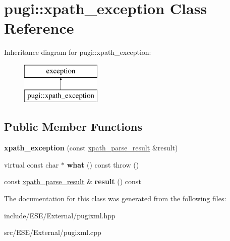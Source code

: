 \hypertarget{classpugi_1_1xpath__exception}{\section{pugi\-:\-:xpath\-\_\-exception Class Reference}
\label{classpugi_1_1xpath__exception}
}
Inheritance diagram for pugi\-:\-:xpath\-\_\-exception\-:\begin{figure}[H]
\begin{center}
\leavevmode
\includegraphics[height=2.000000cm]{classpugi_1_1xpath__exception}
\end{center}
\end{figure}
\subsection*{Public Member Functions}
\begin{DoxyCompactItemize}
\item 
\hypertarget{classpugi_1_1xpath__exception_a67698821481b5a73213d21a1ac174410}{{\bfseries xpath\-\_\-exception} (const \hyperlink{structpugi_1_1xpath__parse__result}{xpath\-\_\-parse\-\_\-result} \&result)}\label{classpugi_1_1xpath__exception_a67698821481b5a73213d21a1ac174410}

\item 
\hypertarget{classpugi_1_1xpath__exception_a986ab92474fa82507981c76ed115ccbd}{virtual const char $\ast$ {\bfseries what} () const   throw ()}\label{classpugi_1_1xpath__exception_a986ab92474fa82507981c76ed115ccbd}

\item 
\hypertarget{classpugi_1_1xpath__exception_a6602bbd541153f35a44c2233aa7d37de}{const \hyperlink{structpugi_1_1xpath__parse__result}{xpath\-\_\-parse\-\_\-result} \& {\bfseries result} () const }\label{classpugi_1_1xpath__exception_a6602bbd541153f35a44c2233aa7d37de}

\end{DoxyCompactItemize}


The documentation for this class was generated from the following files\-:\begin{DoxyCompactItemize}
\item 
include/\-E\-S\-E/\-External/pugixml.\-hpp\item 
src/\-E\-S\-E/\-External/pugixml.\-cpp\end{DoxyCompactItemize}
